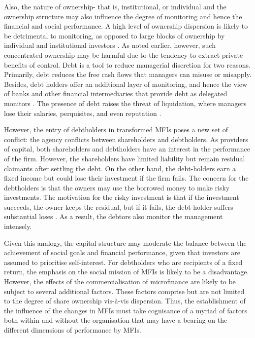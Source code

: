 \documentclass[a4paper, nobind]{templates/ociamthesis}
\begin{document}
Also, the nature of ownership- that is, institutional, or individual and the ownership structure may also influence the degree of monitoring and hence the financial and social performance. A high level of ownership dispersion is likely to be detrimental to monitoring, as opposed to large blocks of ownership by individual and institutional investors \autocite{becht1999blockholdings}. As noted earlier, however, such concentrated ownership may be harmful due to the tendency to extract private benefits of control.
Debt is a tool to reduce managerial discretion for two reasons. Primarily, debt reduces the free cash flows that managers can misuse or misapply. Besides, debt holders offer an additional layer of monitoring, and hence the view of banks and other financial intermediaries that provide debt as delegated monitors \autocite{diamond1996financial}. The presence of debt raises the threat of liquidation, where managers lose their salaries, perquisites, and even reputation \autocite{jensen1976theory}.

However, the entry of debtholders in transformed MFIs poses a new set of conflict: the agency conflicts between shareholders and debtholders. As providers of capital, both shareholders and debtholders have an interest in the performance of the firm. However, the shareholders have limited liability but remain residual claimants after settling the debt. On the other hand, the debt-holders earn a fixed income but could lose their investment if the firm fails. The concern for the debtholders is that the owners may use the borrowed money to make risky investments. The motivation for the risky investment is that if the investment succeeds, the owner keeps the residual, but if it fails, the debt-holder suffers substantial loses \autocite{chu2017shareholder}. As a result, the debtors also monitor the management intensely.

Given this analogy, the capital structure may moderate the balance between the achievement of social goals and financial performance, given that investors are assumed to prioritise self-interest. For debtholders who are recipients of a fixed return, the emphasis on the social mission of MFIs is likely to be a disadvantage. However, the effects of the commercialisation of microfinance are likely to be subject to several additional factors. These factors comprise but are not limited to the degree of share ownership vis-à-vis dispersion. Thus, the establishment of the influence of the changes in MFIs must take cognisance of a myriad of factors both within and without the organisation that may have a bearing on the different dimensions of performance by MFIs.
\end{document}
